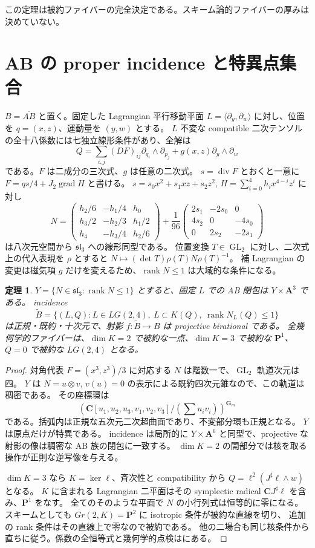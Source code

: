 \documentclass[11pt,a4paper]{ltjsarticle}
\newcommand{\CC}{\mathbf C}
\newcommand{\PP}{\mathbf P}
\renewcommand{\AA}{\mathbf A}
\newcommand{\GG}{\mathbf G}
\DeclareMathOperator{\GL}{GL}
\DeclareMathOperator{\rank}{rank}
\DeclareMathOperator{\grad}{grad}
\newtheorem{theorem}{定理}[section]
\theoremstyle{remark}
\begin{document}
この定理は被約ファイバーの完全決定である。スキーム論的ファイバーの厚みは決めていない。

\section{AB の proper incidence と特異点集合}
$B=\overline{AB}$ と置く。固定した Lagrangian 平行移動平面
$L=\langle\partial_y,\partial_w\rangle$ に対し、位置を $q=(x,z)$、運動量を $(y,w)$ とする。
$L$ 不変な compatible 二次テンソルの全十八係数には七独立線形条件があり、全解は
\[
 Q=\sum_{i,j}(DF)_{ij}\partial_{q_i}\wedge\partial_{p_j}
       +g(x,z)\partial_y\wedge\partial_w
\]
である。$F$ は二成分の三次式、$g$ は任意の二次式。
$s=\operatorname{div}F$ とおくと一意に
$F=qs/4+J_2\grad H$ と書ける。
$s=s_0x^2+s_1xz+s_2z^2$, $H=\sum_{i=0}^4h_i x^{4-i}z^i$ に対し
\[
 N=\begin{pmatrix}h_2/6&-h_1/4&h_0\\h_3/2&-h_2/3&h_1/2\\h_4&-h_3/4&h_2/6\end{pmatrix}
 +\frac1{96}\begin{pmatrix}2s_1&-2s_0&0\\4s_2&0&-4s_0\\0&2s_2&-2s_1\end{pmatrix}
\]
は八次元空間から $\mathfrak{sl}_3$ への線形同型である。
位置変換 $T\in\GL_2$ に対し、二次式上の代入表現を $\rho$ とすると
$N\mapsto(\det T)\rho(T)N\rho(T)^{-1}$。
補 Lagrangian の変更は磁気項 $g$ だけを変えるため、$\rank N\le1$ は大域的な条件になる。

\begin{theorem}\label{thm:ab-incidence-v34}
$Y=\{N\in\mathfrak{sl}_3:\rank N\le1\}$ とすると、固定 $L$ での AB 閉包は $Y\times\AA^3$ である。
incidence
\[
 \widetilde B=\{(L,Q):L\in LG(2,4),\ L\subset K(Q),\ \rank N_L(Q)\le1\}
\]
は正規・既約・十次元で、射影 $f:\widetilde B\to B$ は projective birational である。
全幾何学的ファイバーは、$\dim K=2$ で被約な一点、$\dim K=3$ で被約な $\PP^1$、
$Q=0$ で被約な $LG(2,4)$ となる。
\end{theorem}
\begin{proof}
対角代表 $F=(x^3,z^3)/3$ に対応する $N$ は階数一で、$\GL_2$ 軌道次元は四。
$Y$ は $N=u\otimes v$, $v(u)=0$ の表示による既約四次元錐なので、この軌道は稠密である。
その座標環は
\[
 \left(\CC[u_1,u_2,u_3,v_1,v_2,v_3]/(\textstyle\sum u_iv_i)\right)^{\GG_m}
\]
である。括弧内は正規な五次元二次超曲面であり、不変部分環も正規となる。
$Y$ は原点だけが特異である。
incidence は局所的に $Y\times\AA^6$ と同型で、projective な射影の像は稠密な AB 族の閉包に一致する。
$\dim K=2$ の開部分では核を取る操作が正則な逆写像を与える。

$\dim K=3$ なら $K=\ker\ell$、斉次性と compatibility から
$Q=\ell^2(J^\sharp\ell\wedge w)$ となる。
$K$ に含まれる Lagrangian 二平面はその symplectic radical $\CC J^\sharp\ell$ を含み、$\PP^1$ をなす。
全てのそのような平面で $N$ の小行列式は恒等的に零になる。
スキームとしても $Gr(2,K)=\PP^2$ に isotropic 条件が被約な直線を切り、
追加の rank 条件はその直線上で零なので被約である。
他の二場合も同じ核条件から直ちに従う。係数の全恒等式と幾何学的点検は\cite{ab-incidence-v34}にある。
\end{proof}
\end{document}
